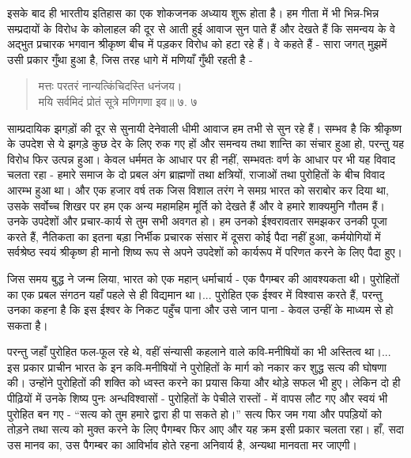 
इसके बाद ही भारतीय इतिहास का एक शोकजनक अध्याय शुरू होता है। हम गीता में भी भिन्न-भिन्न सम्प्रदायों के विरोध के कोलाहल की दूर से आती हुई आवाज सुन पाते हैं और देखते हैं कि समन्वय के वे अद्भुत प्रचारक भगवान श्रीकृष्ण बीच में पड़कर विरोध को हटा रहे हैं। वे कहते हैं - सारा जगत् मुझमें उसी प्रकार गुँथा हुआ है, जिस तरह धागे में मणियाँ गुँथी रहती है -

\begin{verse}
मत्तः परतरं नान्यत्किंचिदस्ति धनंजय।\\मयि सर्वमिदं प्रोतं सूत्रे मणिगणा इव॥ ७. ७ 
\end{verse}

साम्प्रदायिक झगड़ों की दूर से सुनायी देनेवाली धीमी आवाज हम तभी से सुन रहे हैं। सम्भव है कि श्रीकृष्ण के उपदेश से ये झगड़े कुछ देर के लिए रुक गए हों और समन्वय तथा शान्ति का संचार हुआ हो, परन्तु यह विरोध फिर उत्पन्न हुआ। केवल धर्ममत के आधार पर ही नहीं, सम्भवतः वर्ण के आधार पर भी यह विवाद चलता रहा - हमारे समाज के दो प्रबल अंग ब्राह्मणों तथा क्षत्रियों, राजाओं तथा पुरोहितों के बीच विवाद आरम्भ हुआ था। और एक हजार वर्ष तक जिस विशाल तरंग ने समग्र भारत को सराबोर कर दिया था, उसके सर्वोच्च शिखर पर हम एक अन्य महामहिम मूर्ति को देखते हैं और वे हमारे शाक्यमुनि गौतम हैं। उनके उपदेशों और प्रचार-कार्य से तुम सभी अवगत हो। हम उनको ईश्वरावतार समझकर उनकी पूजा करते हैं, नैतिकता का इतना बड़ा निर्भीक प्रचारक संसार में दूसरा कोई पैदा नहीं हुआ, कर्मयोगियों में सर्वश्रेष्ठ स्वयं श्रीकृष्ण ही मानो शिष्य रूप से अपने उपदेशों को कार्यरूप में परिणत करने के लिए पैदा हुए। 

जिस समय बुद्ध ने जन्म लिया, भारत को एक महान् धर्माचार्य - एक पैगम्बर की आवश्यकता थी। पुरोहितों का एक प्रबल संगठन यहाँ पहले से ही विद्यमान था।... पुरोहित एक ईश्वर में विश्वास करते हैं, परन्तु उनका कहना है कि इस ईश्वर के निकट पहुँच पाना और उसे जान पाना - केवल उन्हीं के माध्यम से हो सकता है। 

परन्तु जहाँ पुरोहित फल-फूल रहे थे, वहीं संन्यासी कहलाने वाले कवि-मनीषियों का भी अस्तित्व था।... इस प्रकार प्राचीन भारत के इन कवि-मनीषियों ने पुरोहितों के मार्ग को नकार कर शुद्ध सत्य की घोषणा की। उन्होंने पुरोहितों की शक्ति को ध्वस्त करने का प्रयास किया और थोड़े सफल भी हुए। लेकिन दो ही पीढ़ियों में उनके शिष्य पुनः अन्धविश्वासों - पुरोहितों के पेचीले रास्तों - में वापस लौट गए और स्वयं भी पुरोहित बन गए - “सत्य को तुम हमारे द्वारा ही पा सकते हो।” सत्य फिर जम गया और पपड़ियों को तोड़ने तथा सत्य को मुक्त करने के लिए पैगम्बर फिर आए और यह क्रम इसी प्रकार चलता रहा। हाँ, सदा उस मानव का, उस पैगम्बर का आविर्भाव होते रहना अनिवार्य है, अन्यथा मानवता मर जाएगी। 

